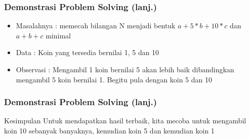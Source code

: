 \begin{frame}
\frametitle{Demonstrasi Problem Solving (lanj.)}
\begin{itemize}
  \item Masalahnya : memecah bilangan N menjadi bentuk $a + 5 * b + 10 * c$ dan $a + b + c$ minimal
  \item Data : Koin yang tersedia bernilai 1, 5 dan 10
  \item Observasi : Mengambil 1 koin bernilai 5 akan lebih baik dibandingkan mengambil 5 koin bernilai 1. Begitu pula dengan koin 5 dan 10
\end{itemize}
\end{frame}

\begin{frame}
\frametitle{Demonstrasi Problem Solving (lanj.)}
\begin{block}{Kesimpulan}
Untuk mendapatkan hasil terbaik, kita mecoba untuk mengambil koin 10 sebanyak banyaknya, kemudian koin 5 dan kemudian koin 1
\end{block}
\end{frame}



